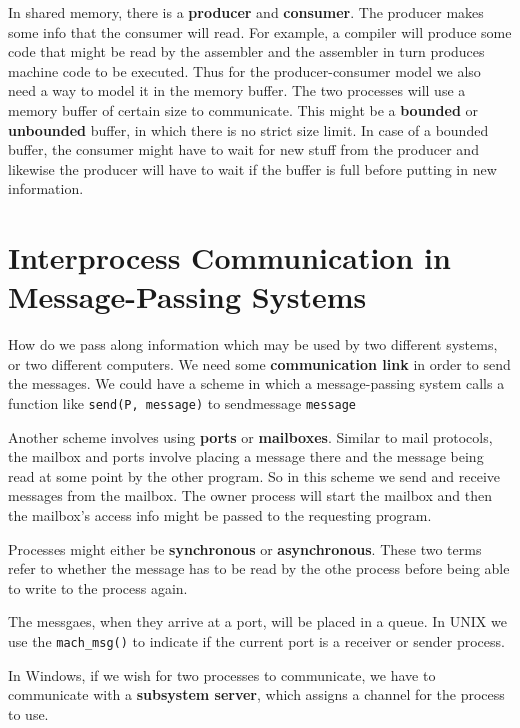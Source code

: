 \documentclass{tufte-handout}
\begin{document}
In shared memory, there is a \textbf{producer} and \textbf{consumer}. The producer makes some
info that the consumer will read. For example, a compiler will produce some code that might
be read by the assembler and the assembler in turn produces machine code to be executed. Thus
for the producer-consumer model we also need a way to model it in the memory buffer. The two
processes will use a memory buffer of certain size to communicate. This might be a 
\textbf{bounded} or \textbf{unbounded} buffer, in which there is no strict size limit.
In case of a bounded buffer, the consumer might have to wait for new stuff from the producer and
likewise the producer will have to wait if the buffer is full before putting in new 
information.

\section{Interprocess Communication in Message-Passing Systems}
How do we pass along information which may be used by two different systems, or two different
computers. We need some \textbf{communication link} in order to send the messages. 
We could have a scheme in which a message-passing system calls a function like 
\texttt{send(P, message)} to sendmessage \texttt{message} 

Another scheme involves using \textbf{ports} or \textbf{mailboxes}. Similar to mail protocols, 
the mailbox and ports involve placing a message there and the message being read at some point
by the other program. So in this scheme we send and receive messages from the mailbox. The 
owner process will start the mailbox and then the mailbox's access info might be passed to the
requesting program.

Processes might either be \textbf{synchronous} or \textbf{asynchronous}. These two terms 
refer to whether the message has to be read by the othe process before being able to write 
to the process again. 

The messgaes, when they arrive at a port, will be placed in a queue. In UNIX we use the 
\texttt{mach\_msg()} to indicate if the current port is a receiver or sender process.

In Windows, if we wish for two processes to communicate, we have to communicate with a 
\textbf{subsystem server}, which assigns a channel for the process to use.
\end{document}
